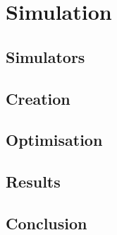 \section{Simulation}\label{simulation}
\subsection{Simulators}\label{simulation_simulators}
\subsection{Creation}\label{simulation_creation}
\subsection{Optimisation}\label{simulation_optimisation}
\subsection{Results}\label{simulation_results}
\subsection{Conclusion}\label{simulation_conclusion}